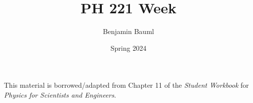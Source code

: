 \documentclass[]{article}
\title{PH 221 Week \Week}
\author{Benjamin Bauml}
\date{Spring 2024}
\newcommand{\FileDepth}{../../..}
\begin{document}
\maketitle
\begin{center}
	This material is borrowed/adapted from Chapter 11 of the \textit{Student Workbook} for \textit{Physics for Scientists and Engineers}.
\end{center}



\end{document}
